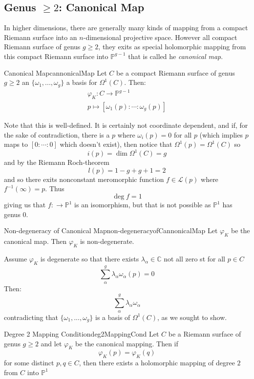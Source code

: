 \documentclass{book}
\newcommand{\C}{{\mathbb{C}}}
\renewcommand{\P}{{\mathbb{P}}}
\newcommand{\CL}{{\mathcal{L}}}
\let\temp\phi
\let\phi\varphi
\let\varphi\temp
\begin{document}
\subsection{Genus $\ge 2$: Canonical Map}

In higher dimensions, there are generally many kinds of mapping from a compact Riemann surface into an
$n$-dimensional projective space. However all compact Riemann surface of genus $g \ge 2$, they exits as
special holomorphic mapping from this compact Riemann surface into $\P^{g-1}$ that is called he
\emph{canonical map}.


\begin{defn}{Canonical Map}{cannonicalMap}
  Let $C$ be a compact Riemann surface of genus $g\ge 2$ an $\{\omega_1, ..., \omega_g\}$ a basis for
  $\Omega^1(C)$. Then:
  \begin{align*}
    \phi_K: C \to \P^{g-1}\\
    p \mapsto [\omega_1(p): \cdots : \omega_g(p)]
  \end{align*}
\end{defn}

Note that this is well-defined. It is certainly not coordinate dependent, and if, for the sake of
contradiction, there is a $p$ where $\omega_i(p) = 0$ for all $p$ (which implies $p$ maps to $[0:\cdots: 0]$
which doesn't exist), then notice that $\Omega^1(p) = \Omega^1(C)$ so
\[
  i(p) = \dim \Omega^1(C) = g
\]
and by the Riemann Roch-theorem
\[
  l(p) = 1-g+g+1=  2
\]
and so there exits nonconstant meromorphic function $f \in \CL(p)$ where $f^{-1}(\infty) = p$. Thus
\[
  \deg f  = 1
\]
giving us that $f:  \to \P^1$ is an isomorphism, but that is not possible as $\P^1$ has genus $0$.

\begin{prop}{Non-degeneracy of Canonical Map}{non-degeneracyofCannonicalMap}
  Let $\phi_K$ be the canonical map. Then $\phi_K$ is non-degenerate.
\end{prop}

\begin{Proof}
  Assume $\phi_K$ is degenerate so that there exists $\lambda_\alpha \in \C$ not all zero st for all $p \in C$
  \[
    \sum_\alpha^g \lambda_\alpha\omega_\alpha(p) = 0
  \]
  Then:
  \[
    \sum_\alpha^g \lambda_\alpha\omega_\alpha
  \]
  contradicting that $\{\omega_1, ..., \omega_g\}$ is a basis of $\Omega^1(C)$, as we sought to show.
\end{Proof}

\begin{prop}{Degree 2 Mapping Condition}{deg2MappingCond}
  Let $C$ be a Riemann surface of genus $g\ge 2$ and let $\phi_K$ be the canonical mapping. Then if
  \[
    \phi_K(p) = \phi_K(q)
  \]
  for some distinct $p,q \in C$, then there exists a holomorphic mapping of degree $2$ from $C$ into $\P^1$
\end{prop}
\end{document}
